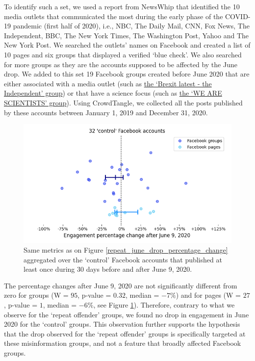 \documentclass[review]{elsarticle}
\begin{document}
{To identify such a set, we used a report from NewsWhip \citep{NewsWhipReport} that identified the 10 media outlets that communicated the most during the early phase of the COVID-19 pandemic (first half of 2020), i.e., NBC, The Daily Mail, CNN, Fox News, The Independent, BBC, The New York Times, The Washington Post, Yahoo and The New York Post.
We searched the outlets' names on Facebook and created a list of 10 pages and six groups that displayed a verified `blue check'.
We also searched for more groups as they are the accounts supposed to be affected by the June drop.
We added to this set 19 Facebook groups created before June 2020 that are either associated with a media outlet (such as \href{https://www.facebook.com/groups/brexitlatest/}{the `Brexit latest - the Independent' group}) or that have a science focus (such as \href{https://www.facebook.com/groups/437670336804119/}{the `WE ARE SCIENTISTS' group}).
Using CrowdTangle, we collected all the posts published by these accounts between January 1, 2019 and December 31, 2020.

\begin{figure}[!h]
\centering
\includegraphics[scale=0.5]{./../figure/supplementary_mainstream_june_drop_percentage_change.png}
\caption{
Same metrics as on Figure \ref{repeat_june_drop_percentage_change} aggregated over the `control' Facebook accounts that published at least once during 30 days before and after June 9, 2020.
}
\label{june_drop_control}
\end{figure}

The percentage changes after June 9, 2020 are not significantly different from zero for groups (W = $95$, p-value = $0.32$, median = $-7\%$) and for pages (W = $27$, p-value = $1$, median = $-6\%$, see Figure \ref{june_drop_control}).
Therefore, contrary to what we observe for the `repeat offender' groups, we found no drop in engagement in June 2020 for the `control' groups.
This observation further supports the hypothesis that the drop observed for the `repeat offender' groups is specifically targeted at these misinformation groups, and not a feature that broadly affected Facebook groups.

}
\end{document}

